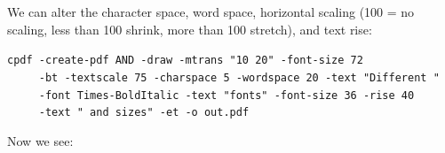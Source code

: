 \documentclass{book}
\begin{document}
\noindent We can alter the character space, word space, horizontal scaling (100 = no scaling, less than 100 shrink, more than 100 stretch), and text rise:

\begin{framed}
 \noindent\small\verb?cpdf -create-pdf AND -draw -mtrans "10 20" -font-size 72?\\
 \noindent\small\verb?     -bt -textscale 75 -charspace 5 -wordspace 20 -text "Different "?\\
 \noindent\small\verb?     -font Times-BoldItalic -text "fonts" -font-size 36 -rise 40?\\
 \noindent\small\verb?     -text " and sizes" -et -o out.pdf? 
\end{framed}

\noindent Now we see:

\bigskip
\ifdefined\HCode
{}
\else
{}
\fi
\bigskip
\end{document}

